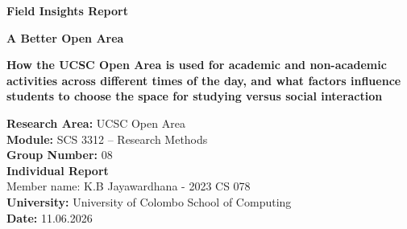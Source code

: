 \documentclass[12pt]{report}
\begin{document}
\begin{titlepage}
    \centering
    
    \vspace*{1.5cm}
    
    {\Huge \textbf{Field Insights Report}}\\[1.5cm]
    
    \vspace{2cm}

    \vspace*{1.0cm}
    
    { \textbf{A Better Open Area}}\\[1.5cm]
    
    \vspace{1cm}
    
    {\Large
    \textbf{How the UCSC Open Area is used for academic and non-academic activities across different times of the day, and what factors influence students to choose the space for studying versus social interaction}
    }\\[2cm]
    
    \vfill
    
    \begin{flushleft}
    \textbf{Research Area:} UCSC Open Area\\[0.5cm]
    
    \textbf{Module:} SCS 3312 -- Research Methods\\[0.5cm]

    \textbf{Group Number:} 08\\[0.5cm]
    
    
    \textbf{Individual Report}\\
    Member name:  K.B Jayawardhana - 2023 CS 078\\[0.5cm]
    
    \textbf{University:} University of Colombo School of Computing\\[0.5cm]
    
    \textbf{Date:} 11.06.2026
    \end{flushleft}
    
\end{titlepage}


\end{document}
